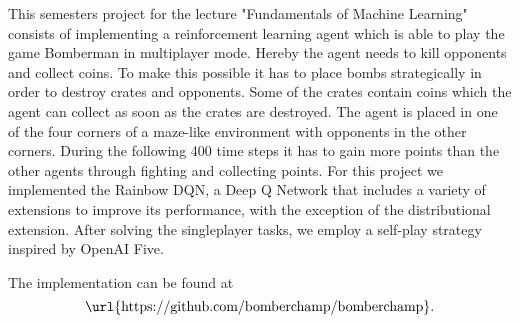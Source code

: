 This semesters project for the lecture "Fundamentals of Machine Learning" consists of implementing a reinforcement learning agent which is able to play the game Bomberman in multiplayer mode.
Hereby the agent needs to kill opponents and collect coins. To make this possible it has to place bombs strategically in order to destroy crates and opponents. Some of the crates contain coins which the agent can collect as soon as the crates are destroyed.
The agent is placed in one of the four corners of a maze-like environment with opponents in the other corners.
During the following 400 time steps it has to gain more points than the other agents through fighting and collecting points.
For this project we implemented the Rainbow DQN\cite{Hessel2018RainbowCI}, a Deep Q Network that includes a variety of extensions to improve its performance, with the exception of the distributional extension. After solving the singleplayer tasks, we employ a self-play strategy inspired by OpenAI Five\cite{OpenAI_dota}.

The implementation can be found at $$\text{\url{https://github.com/bomberchamp/bomberchamp}}.$$
